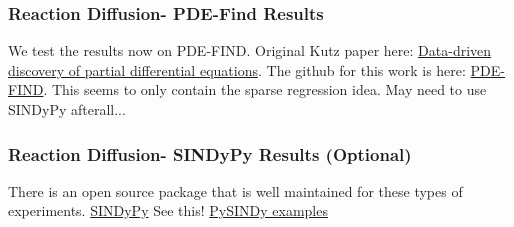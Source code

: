 \documentclass[12pt]{article}
\begin{document}
\subsubsection{Reaction Diffusion- PDE-Find Results}
We test the results now on PDE-FIND. Original Kutz paper here: \href{https://www.science.org/doi/pdf/10.1126/sciadv.1602614}{Data-driven discovery of partial differential equations}.
The github for this work is here: \href{https://github.com/snagcliffs/PDE-FIND}{PDE-FIND}.
This seems to only contain the sparse regression idea. May need to use SINDyPy afterall...

\subsubsection{Reaction Diffusion- SINDyPy Results (Optional)}
There is an open source package that is well maintained for these types of experiments.
\href{https://github.com/dynamicslab/pysindy}{SINDyPy}
See this! \href{https://pysindy.readthedocs.io/en/stable/examples/10_PDEFIND_examples.html#test-pde-functionality-on-2d-reaction-diffusion-system}{PySINDy examples} 
\end{document}
